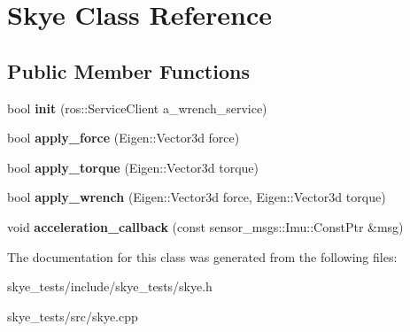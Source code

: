 \hypertarget{class_skye}{\section{Skye Class Reference}
\label{class_skye}
}
\subsection*{Public Member Functions}
\begin{DoxyCompactItemize}
\item 
\hypertarget{class_skye_a89002d33382d57933266cd24f2e6d73d}{bool {\bfseries init} (ros\-::\-Service\-Client a\-\_\-wrench\-\_\-service)}\label{class_skye_a89002d33382d57933266cd24f2e6d73d}

\item 
\hypertarget{class_skye_a796d5a0a8aae2a687c27f67d659ff891}{bool {\bfseries apply\-\_\-force} (Eigen\-::\-Vector3d force)}\label{class_skye_a796d5a0a8aae2a687c27f67d659ff891}

\item 
\hypertarget{class_skye_a2ee554cf4c1c3d71f5e2a57434674b8c}{bool {\bfseries apply\-\_\-torque} (Eigen\-::\-Vector3d torque)}\label{class_skye_a2ee554cf4c1c3d71f5e2a57434674b8c}

\item 
\hypertarget{class_skye_ab54fb4df58366d689045f4c4506d999e}{bool {\bfseries apply\-\_\-wrench} (Eigen\-::\-Vector3d force, Eigen\-::\-Vector3d torque)}\label{class_skye_ab54fb4df58366d689045f4c4506d999e}

\item 
\hypertarget{class_skye_a0f74d02e4e756a00303eced5a197b1cd}{void {\bfseries acceleration\-\_\-callback} (const sensor\-\_\-msgs\-::\-Imu\-::\-Const\-Ptr \&msg)}\label{class_skye_a0f74d02e4e756a00303eced5a197b1cd}

\end{DoxyCompactItemize}


The documentation for this class was generated from the following files\-:\begin{DoxyCompactItemize}
\item 
skye\-\_\-tests/include/skye\-\_\-tests/skye.\-h\item 
skye\-\_\-tests/src/skye.\-cpp\end{DoxyCompactItemize}
